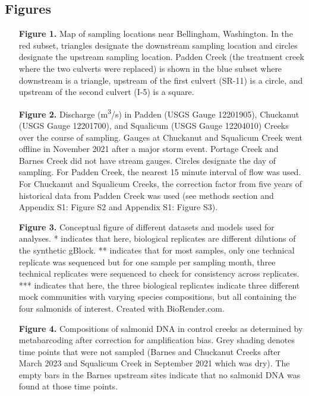 \documentclass[
]{article}
\begin{document}
\newpage

\hypertarget{figures}{%
\subsection{Figures}\label{figures}}

\begin{itemize}
\setlength{\itemindent}{4em}
\item[\textbf{Figure 1.}] Map of sampling locations near Bellingham, Washington. In the red subset, triangles designate the downstream sampling location and circles designate the upstream sampling location. Padden Creek (the treatment creek where the two culverts were replaced) is shown in the blue subset where downstream is a triangle, upstream of the first culvert (SR-11) is a circle, and upstream of the second culvert (I-5) is a square.
\item[\textbf{Figure 2.}] Discharge (m\textsuperscript{3}/s) in Padden (USGS Gauge 12201905), Chuckanut (USGS Gauge 12201700), and Squalicum (USGS Gauge 12204010) Creeks over the course of sampling. Gauges at Chuckanut and Squalicum Creek went offline in November 2021 after a major storm event. Portage Creek and Barnes Creek did not have stream gauges. Circles designate the day of sampling. For Padden Creek, the nearest 15 minute interval of flow was used. For Chuckanut and Squalicum Creeks, the correction factor from five years of historical data from Padden Creek was used (see methods section and Appendix S1: Figure S2 and Appendix S1: Figure S3).
\item[\textbf{Figure 3.}] Conceptual figure of different datasets and models used for analyses. * indicates that here, biological replicates are different dilutions of the synthetic gBlock. ** indicates that for most samples, only one technical replicate was sequenced but for one sample per sampling month, three technical replicates were sequenced to check for consistency across replicates. *** indicates that here, the three biological replicates indicate three different mock communities with varying species compositions, but all containing the four salmonids of interest. Created with BioRender.com.
\item[\textbf{Figure 4.}] Compositions of salmonid DNA in control creeks as determined by metabarcoding after correction for amplification bias. Grey shading denotes time points that were not sampled (Barnes and Chuckanut Creeks after March 2023 and Squalicum Creek in September 2021 which was dry). The empty bars in the Barnes upstream sites indicate that no salmonid DNA was found at those time points.

\end{itemize}
\end{document}
